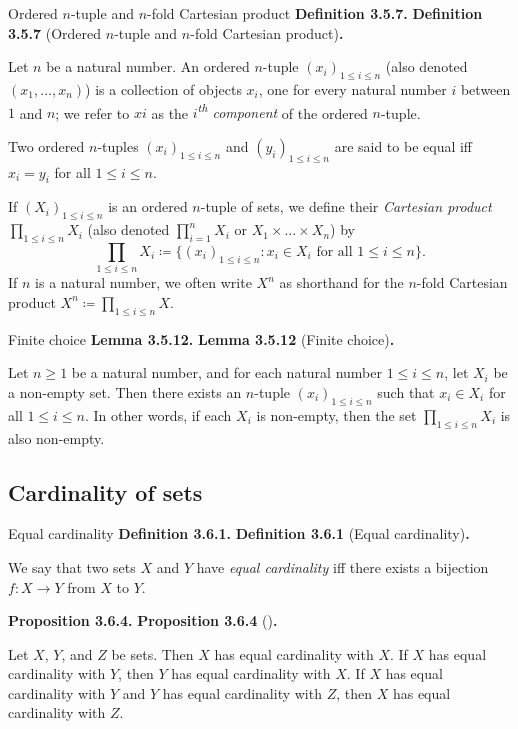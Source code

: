 \documentclass[12pt]{article}
\newenvironment{df}[2][\relax]{
\vspace{4mm}
    \noindent\setlength{\parskip}{1em}%
    \ifx#1\relax%
        \textbf{#2. }%
    \else%
        \textbf{#2} (#1)\textbf{. }%
    \fi%
    \ignorespaces%
}{}
\theoremstyle{remark}
\begin{document}
\begin{df}[Ordered $n$-tuple and $n$-fold Cartesian product]{Definition 3.5.7}
    Let $n$ be a natural number.
    An ordered $n$-tuple $(x_i)_{1 \le i \le n}$ (also denoted $(x_1, \ldots , x_n)$) is a collection of objects $x_i$, one for every natural number $i$ between $1$ and $n$;
    we refer to $xi$ as the \emph{$i$\textsuperscript{th} component} of the ordered
    $n$-tuple.
    
    Two ordered $n$-tuples $(x_i)_{1 \le i \le n}$ and $(y_i)_{1 \le i \le n}$ are said to be equal iff $x_i = y_i$ for all $1 \le i \le n$.
    
    If $(X_i)_{1 \le i \le n}$ is an ordered $n$-tuple of sets, we define their \emph{Cartesian product} $\prod_{1 \le i \le n} X_i$ (also denoted $\prod^n_{i=1} X_i$ or $X_1 \times \ldots \times X_n$) by
    \[
        \prod_{1 \le i \le n} X_i \coloneqq \{(x_i)_{1 \le i \le n} : x_i \in X_i \text{ for all } 1 \le i \le n \}.
    \]
    If $n$ is a natural number, we often write $X^n$ as shorthand for the $n$-fold Cartesian product $X^n \coloneqq \prod_{1 \le i \le n} X$.
\end{df}


\begin{df}[Finite choice]{Lemma 3.5.12}
    Let $n \ge 1$ be a natural number, and for each natural number $1 \le i \le n$, let $X_i$ be a non-empty set.
    Then there exists an $n$-tuple $(x_i)_{1 \le i \le n}$ such that $x_i \in X_i$ for all $1 \le i \le n$.
    In other words, if each $X_i$ is non-empty, then the set $\prod_{1 \le i \le n} X_i$ is also non-empty.
\end{df}


\subsection{Cardinality of sets}

\begin{df}[Equal cardinality]{Definition 3.6.1}
    We say that two sets $X$ and $Y$ have \emph{equal cardinality} iff there exists a bijection $f : X \to Y$ from $X$ to $Y$.
\end{df}


\begin{df}{Proposition 3.6.4}
    Let $X$, $Y$, and $Z$ be sets.
    Then $X$ has equal cardinality with $X$.
    If $X$ has equal cardinality with $Y$, then $Y$ has equal cardinality with $X$.
    If $X$ has equal cardinality with $Y$ and $Y$ has equal cardinality with $Z$, then $X$ has equal cardinality with $Z$.
\end{df}
\end{document}
